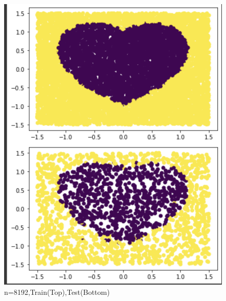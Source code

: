 \documentclass[a4paper]{article}
\theoremstyle{definition}
\newenvironment{soln}{
    \leavevmode\color{blue}\ignorespaces
}{}
\begin{document}
\begin{enumerate}
\begin{soln}
\begin{figure}[H]
            \includegraphics[scale=0.5]{8192.png}
            \caption{n=8192,Train(Top),Test(Bottom)}
            \label{fig:q2}
        \end{figure} 
  \end{soln}
  
\end{enumerate}
\end{document}
